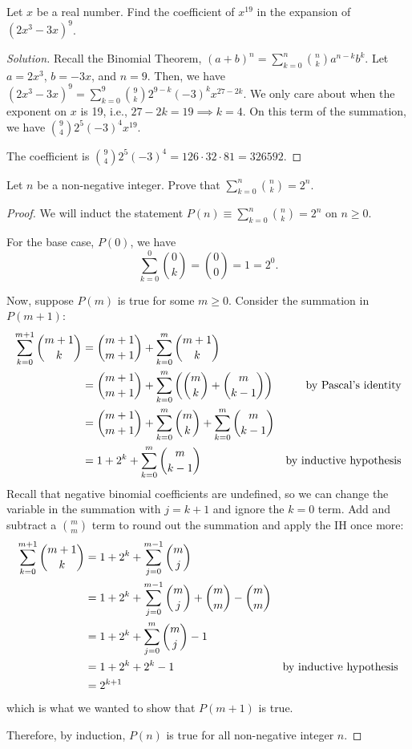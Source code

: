 \question Let $x$ be a real number.
Find the coefficient of $x^{19}$ in the expansion of $(2x^3-3x)^9$.
\begin{proof}[Solution]
  Recall the Binomial Theorem, $(a+b)^n = \sum_{k=0}^n\binom{n}{k}a^{n-k}b^k$.
  Let $a = 2x^3$, $b = -3x$, and $n=9$.
  Then, we have $(2x^3-3x)^9 = \sum_{k=0}^9\binom{9}{k}2^{9-k}(-3)^k x^{27-2k}$.
  We only care about when the exponent on $x$ is 19, i.e., $27-2k=19 \implies k = 4$.
  On this term of the summation, we have $\binom{9}{4}2^5 (-3)^4 x^{19}$.

  The coefficient is $\binom{9}{4}2^5 (-3)^4 = 126 \cdot 32 \cdot 81 = 326592$.
\end{proof}


\question Let $n$ be a non-negative integer.
Prove that $\displaystyle \sum_{k=0}^n \binom{n}{k} = 2^n$.
\begin{proof}
  We will induct the statement $P(n) \equiv \sum_{k=0}^n \binom{n}{k} = 2^n$ on $n \geq 0$.

  For the base case, $P(0)$, we have \[ \sum_{k=0}^0 \binom{0}{k} = \binom{0}{0} = 1 = 2^0. \]

  Now, suppose $P(m)$ is true for some $m \geq 0$.
  Consider the summation in $P(m+1)$:
  \begin{align*}
    \sum_{k=0}^{m+1} \binom{m+1}{k}
     & = \binom{m+1}{m+1} + \sum_{k=0}^m \binom{m+1}{k}                                \\
     & = \binom{m+1}{m+1} + \sum_{k=0}^m \left( \binom{m}{k} + \binom{m}{k-1}  \right)
    & \text{by Pascal's identity}                                                             \\
     & = \binom{m+1}{m+1} + \sum_{k=0}^m \binom{m}{k} + \sum_{k=0}^m \binom{m}{k-1}    \\
     & = 1 + 2^k + \sum_{k=0}^m \binom{m}{k-1} & \text{by inductive hypothesis}
  \end{align*}
  Recall that negative binomial coefficients are undefined, so we can change the variable in the summation with $j=k+1$ and ignore the $k=0$ term.
  Add and subtract a $\binom{m}{m}$ term to round out the summation and apply the IH once more:
  \begin{align*}
    \sum_{k=0}^{m+1} \binom{m+1}{k}
     & = 1 + 2^k + \sum_{j=0}^{m-1} \binom{m}{j}                               \\
     & = 1 + 2^k + \sum_{j=0}^{m-1} \binom{m}{j} + \binom{m}{m} - \binom{m}{m} \\
     & = 1 + 2^k + \sum_{j=0}^{m} \binom{m}{j} - 1                             \\
     & = 1 + 2^k + 2^k - 1 & \text{by inductive hypothesis}                                                 \\
     & = 2^{k+1}
  \end{align*}
  which is what we wanted to show that $P(m+1)$ is true.

  Therefore, by induction, $P(n)$ is true for all non-negative integer $n$.
\end{proof}


